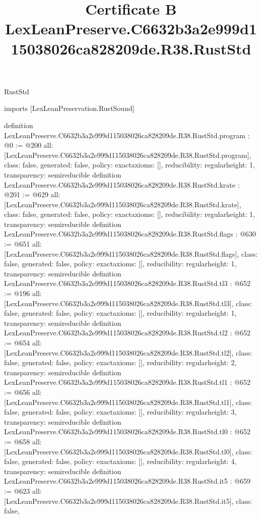 \begin{lexlean}{RustStd}
\title{Certificate B LexLeanPreserve.C6632b3a2e999d115038026ca828209de.R38.RustStd}
\begin{coremodule}
imports [LexLeanPreservation.RustSound]

definition LexLeanPreserve.C6632b3a2e999d115038026ca828209de.R38.RustStd.program : @0 := @200 {
  all: [LexLeanPreserve.C6632b3a2e999d115038026ca828209de.R38.RustStd.program],
  class: false,
  generated: false,
  policy: exact{axioms: []},
  reducibility: regular{height: 1},
  transparency: semireducible
}
definition LexLeanPreserve.C6632b3a2e999d115038026ca828209de.R38.RustStd.krate : @201 := @629 {
  all: [LexLeanPreserve.C6632b3a2e999d115038026ca828209de.R38.RustStd.krate],
  class: false,
  generated: false,
  policy: exact{axioms: []},
  reducibility: regular{height: 1},
  transparency: semireducible
}
definition LexLeanPreserve.C6632b3a2e999d115038026ca828209de.R38.RustStd.flags : @630 := @651 {
  all: [LexLeanPreserve.C6632b3a2e999d115038026ca828209de.R38.RustStd.flags],
  class: false,
  generated: false,
  policy: exact{axioms: []},
  reducibility: regular{height: 1},
  transparency: semireducible
}
definition LexLeanPreserve.C6632b3a2e999d115038026ca828209de.R38.RustStd.tl3 : @652 := @196 {
  all: [LexLeanPreserve.C6632b3a2e999d115038026ca828209de.R38.RustStd.tl3],
  class: false,
  generated: false,
  policy: exact{axioms: []},
  reducibility: regular{height: 1},
  transparency: semireducible
}
definition LexLeanPreserve.C6632b3a2e999d115038026ca828209de.R38.RustStd.tl2 : @652 := @654 {
  all: [LexLeanPreserve.C6632b3a2e999d115038026ca828209de.R38.RustStd.tl2],
  class: false,
  generated: false,
  policy: exact{axioms: []},
  reducibility: regular{height: 2},
  transparency: semireducible
}
definition LexLeanPreserve.C6632b3a2e999d115038026ca828209de.R38.RustStd.tl1 : @652 := @656 {
  all: [LexLeanPreserve.C6632b3a2e999d115038026ca828209de.R38.RustStd.tl1],
  class: false,
  generated: false,
  policy: exact{axioms: []},
  reducibility: regular{height: 3},
  transparency: semireducible
}
definition LexLeanPreserve.C6632b3a2e999d115038026ca828209de.R38.RustStd.tl0 : @652 := @658 {
  all: [LexLeanPreserve.C6632b3a2e999d115038026ca828209de.R38.RustStd.tl0],
  class: false,
  generated: false,
  policy: exact{axioms: []},
  reducibility: regular{height: 4},
  transparency: semireducible
}
definition LexLeanPreserve.C6632b3a2e999d115038026ca828209de.R38.RustStd.it5 : @659 := @623 {
  all: [LexLeanPreserve.C6632b3a2e999d115038026ca828209de.R38.RustStd.it5],
  class: false,
}
\end{coremodule}
\end{lexlean}
